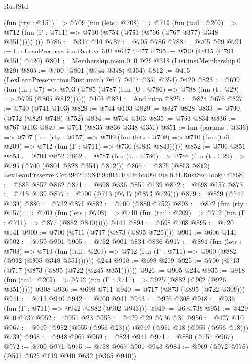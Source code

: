 \begin{lexlean}{RustStd}
\begin{coremodule}
        (fun (rty : @157) =>
        @709
          (fun (lets : @708) =>
          @710
            (fun (tail : @209) =>
            @712 (fun (Γ : @711) => @730 (@754 (@761 (@766 (@767 @377) @348 @351)))))))))
@786 := @317 @10
@787 := @705 @786
@788 := @705 @29
@791 := LexLeanPreservation.Rust.validU @647 @477
@795 := @700 (@415 (@791 @351) @420)
@801 := Membership.mem.{0, 0} @29 @318 (List.instMembership.{0} @29)
@805 := @700 (@801 (@744 @348) @354)
@812 := @415 (LexLeanPreservation.Rust.uninh @647 @477 @351 @354) @420
@823 := @699
    (fun (fn : @7) =>
    @703 (@785 (@787 (fun (U : @786) => @788 (fun (t : @29) => @795 (@805 @812))))))
    @103
@824 := And.intro
@825 := @824 @676
@827 := @740 (@741 @103)
@828 := @744 @103
@829 := @827 @828
@833 := @700 (@732 (@829 @748) @752)
@834 := @764 @103
@835 := @763 @834
@836 := @767 @103
@840 := @761 (@835 @836 @348 @351)
@851 := fun (params : @336) =>
  @707
    (fun (rty : @157) =>
    @709
      (fun (lets : @708) => @710 (fun (tail : @209) => @712 (fun (Γ : @711) => @730 (@833 @840)))))
@852 := @706 @851
@853 := @704 @852
@862 := @787 (fun (U : @786) => @788 (fun (t : @29) => @795 (@700 (@801 @828 @354) @812)))
@866 := @825 (@853 @862) LexLeanPreserve.Cc639d244984595f0311043c4c505146e.R31.RustStd.look0
@868 := @685 @852 @862
@871 := @698 @336 @851 @139
@872 := @698 @157
@873 := @718 @139
@877 := @700 (@713 (@717 (@873 @726)))
@879 := @829 (@747 @139)
@880 := @732 @879
@882 := @700 (@880 @752)
@893 := @872
    (fun (rty : @157) =>
    @709
      (fun (lets : @708) => @710 (fun (tail : @209) => @712 (fun (Γ : @711) => @877 (@882 @840)))))
    @141
@894 := @698 @708
@895 := @720 @141
@900 := @700 (@713 (@717 (@873 (@895 @725))))
@901 := @606 @141
@902 := @759 @901
@905 := @762 @901 @834 @836
@917 := @894
    (fun (lets : @708) =>
    @710 (fun (tail : @209) => @712 (fun (Γ : @711) => @900 (@882 (@902 (@905 @348 @351))))))
    @244
@918 := @698 @209
@925 := @700 (@713 (@717 (@873 (@895 (@722 (@245 @351))))))
@926 := @905 @244
@935 := @918 (fun (tail : @209) => @712 (fun (Γ : @711) => @925 (@882 (@902 (@926 @351))))) @308
@936 := @698 @711
@940 := @717 (@873 (@895 (@722 @309)))
@941 := @713 @940
@942 := @700 @941
@943 := @926 @308
@948 := @936 (fun (Γ : @711) => @942 (@882 (@902 @943)))
@949 := @6 @738
@951 := @429 @10 @737
@952 := @951 @23
@955 := @429 @29 @736 @31
@956 := @427 @10
@967 := @949 (@952 (@955 (@956 @23))) (@949 (@951 @18 (@955 (@956 @18))) @739)
@968 := @948 @967
@969 := @824 @941
@971 := @880 (@751 @967)
@972 := @700 @971
@975 := @758 @967 @901 @943
@984 := @969 (@972 @975) (@501 @625 @619 @940 @632 (@365 @940))

\end{coremodule}
\end{lexlean}
